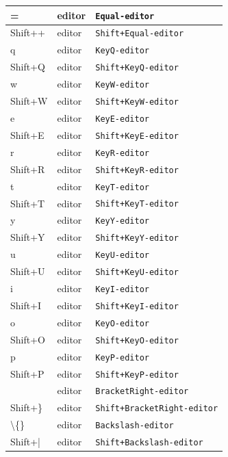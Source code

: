 \documentclass[11pt, a4paper]{article}
\begin{document}
\begin{appendices}
\begin{longtable}{|p{}|p{}|p{}|}
    = & editor & \texttt{Equal-editor} \\ \hline
    Shift++ & editor & \texttt{Shift+Equal-editor} \\ \hline
    q & editor & \texttt{KeyQ-editor} \\ \hline
    Shift+Q & editor & \texttt{Shift+KeyQ-editor} \\ \hline
    w & editor & \texttt{KeyW-editor} \\ \hline
    Shift+W & editor & \texttt{Shift+KeyW-editor} \\ \hline
    e & editor & \texttt{KeyE-editor} \\ \hline
    Shift+E & editor & \texttt{Shift+KeyE-editor} \\ \hline
    r & editor & \texttt{KeyR-editor} \\ \hline
    Shift+R & editor & \texttt{Shift+KeyR-editor} \\ \hline
    t & editor & \texttt{KeyT-editor} \\ \hline
    Shift+T & editor & \texttt{Shift+KeyT-editor} \\ \hline
    y & editor & \texttt{KeyY-editor} \\ \hline
    Shift+Y & editor & \texttt{Shift+KeyY-editor} \\ \hline
    u & editor & \texttt{KeyU-editor} \\ \hline
    Shift+U & editor & \texttt{Shift+KeyU-editor} \\ \hline
    i & editor & \texttt{KeyI-editor} \\ \hline
    Shift+I & editor & \texttt{Shift+KeyI-editor} \\ \hline
    o & editor & \texttt{KeyO-editor} \\ \hline
    Shift+O & editor & \texttt{Shift+KeyO-editor} \\ \hline
    p & editor & \texttt{KeyP-editor} \\ \hline
    Shift+P & editor & \texttt{Shift+KeyP-editor} \\ \hline
    [ & editor & \texttt{BracketLeft-editor} \\ \hline
    Shift+\{ & editor & \texttt{Shift+BracketLeft-editor} \\ \hline
    ] & editor & \texttt{BracketRight-editor} \\ \hline
    Shift+\} & editor & \texttt{Shift+BracketRight-editor} \\ \hline
    \textbackslash\{\} & editor & \texttt{Backslash-editor} \\ \hline
    Shift+| & editor & \texttt{Shift+Backslash-editor} \\ \hline

\end{longtable}
\end{appendices}
\end{document}
